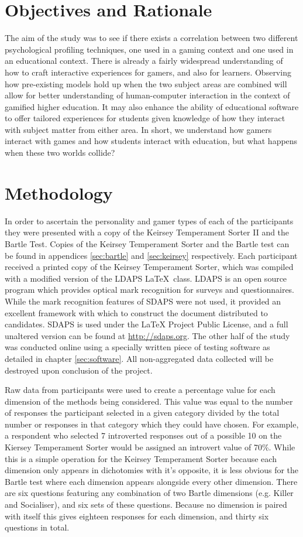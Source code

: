 \documentclass[12pt,a4paper,twoside]{report}
\begin{document}
\section{Objectives and Rationale}
The aim of the study was to see if there exists a correlation between two different psychological profiling techniques, one used in a gaming context and one used in an educational context. There is already a fairly widespread understanding of how to craft interactive experiences for gamers, and also for learners. Observing how pre-existing models hold up when the two subject areas are combined will allow for better understanding of human-computer interaction in the context of gamified higher education. It may also enhance the ability of educational software to offer tailored experiences for students given knowledge of how they interact with subject matter from either area. In short, we understand how gamers interact with games and how students interact with education, but what happens when these two worlds collide?

\section{Methodology}
In order to ascertain the personality and gamer types of each of the participants they were presented with a copy of the Keirsey Temperament Sorter II and the Bartle Test. Copies of the Keirsey Temperament Sorter and the Bartle test can be found in appendices \ref{sec:bartle} and \ref{sec:keirsey} respectively. Each participant received a printed copy of the Keirsey Temperament Sorter, which was compiled with a modified version of the LDAPS  \LaTeX \ class. LDAPS is an open source program which provides optical mark recognition for surveys and questionnaires. While the mark recognition features of SDAPS were not used, it provided an excellent framework with which to construct the document distributed to candidates. SDAPS is used under the LaTeX Project Public License, and a full unaltered version can be found at \url{http://sdaps.org}. The other half of the study was conducted online using a specially written piece of testing software as detailed in chapter \ref{sec:software}. All non-aggregated data collected will be destroyed upon conclusion of the project.

Raw data from participants were used to create a percentage value for each dimension of the methods being considered. This value was equal to the number of responses the participant selected in a given category divided by the total number or responses in that category which they could have chosen. For example, a respondent who selected 7 introverted responses out of a possible 10 on the Kiersey Temperament Sorter would be assigned an introvert value of 70\%. While this is a simple operation for the Keirsey Temperament Sorter because each dimension only appears in dichotomies with it's opposite, it is less obvious for the Bartle test where each dimension appears alongside every other dimension. There are six questions featuring any combination of two Bartle dimensions (e.g. Killer and Socialiser), and six sets of these questions. Because no dimension is paired with itself this gives eighteen responses for each dimension, and thirty six questions in total.
\end{document}
